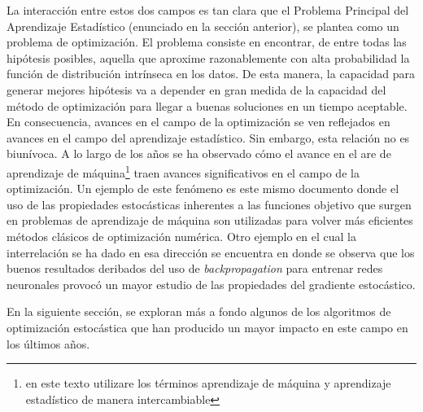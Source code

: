 \documentclass{book}
\theoremstyle{plain}
\theoremstyle{definition}
\theoremstyle{remark}
\begin{document}
La interacción entre estos dos campos es tan clara que el Problema Principal del Aprendizaje Estadístico (enunciado en la sección anterior),  se plantea como un problema de optimización. El problema consiste en encontrar, de entre todas las hipótesis posibles, aquella que aproxime razonablemente con alta probabilidad la función de distribución intrínseca en los datos. De esta manera, la capacidad para generar mejores hipótesis va a depender en gran medida de la capacidad del método de optimización para llegar a buenas soluciones en un tiempo aceptable. En consecuencia, avances en el campo de la optimización se ven reflejados en avances en el campo del aprendizaje estadístico. Sin embargo, esta relación no es biunívoca. A lo largo de los años se ha observado cómo el avance en el are de aprendizaje de máquina\footnote{en este texto utilizare los términos aprendizaje de máquina y aprendizaje estadístico de manera intercambiable} traen avances significativos en el campo de la optimización. Un ejemplo de este fenómeno es este mismo documento donde el uso de las propiedades estocásticas inherentes a las funciones objetivo que surgen en problemas de aprendizaje de máquina son utilizadas para volver más eficientes métodos clásicos de optimización numérica. Otro ejemplo en el cual la interrelación se ha dado en esa dirección se encuentra en \cite{BENNETT} donde se observa que los buenos resultados deribados del uso  de \emph{backpropagation} para entrenar redes neuronales provocó un mayor estudio de las propiedades del gradiente estocástico. 

En la siguiente sección, se exploran más a fondo algunos de los algoritmos de optimización estocástica que han producido un mayor impacto en este campo en los últimos años. 





\end{document}
